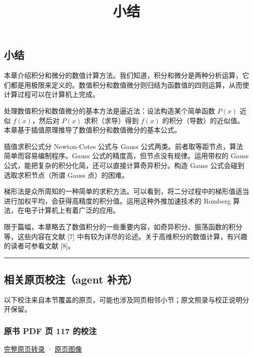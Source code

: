 \documentclass[
  10pt,
  fontset=fandol]{ctexart}
\title{小结}
\author{}
\date{}
\begin{document}
\maketitle

\subsection{小结}\label{ux5c0fux7ed3}

本章介绍积分和微分的数值计算方法。我们知道，积分和微分是两种分析运算，它们都是用极限来定义的。数值积分和数值微分则归结为函数值的四则运算，从而使计算过程可以在计算机上完成。

处理数值积分和数值微分的基本方法是逼近法：设法构造某个简单函数 \(P(x)\) 近似 \(f(x)\)，然后对 \(P(x)\) 求积（求导）得到 \(f(x)\) 的积分（导数）的近似值。本章基于插值原理推导了数值积分和数值微分的基本公式。

插值求积公式分 Newton-Cotes 公式与 Gauss 公式两类。前者取等距节点，算法简单而容易编制程序。Gauss 公式的精度高，但节点没有规律。运用带权的 Gauss 公式，能把复杂的积分化简，还可以直接计算奇异积分。构造 Gauss 公式会碰到选取求积节点（所谓 Gauss 点）的困难。

梯形法是众所周知的一种简单的求积方法。可以看到，将二分过程中的梯形值适当进行加权平均，会获得高精度的积分值。运用这种外推加速技术的 Romberg 算法，在电子计算机上有着广泛的应用。

限于篇幅，本章略去了数值积分的一些重要内容，如奇异积分、振荡函数的积分等，这些内容在文献 {[}7{]} 中有较为详尽的论述。关于高维积分的数值计算，有兴趣的读者可参看文献 {[}8{]}。

\begin{center}\rule{0.5\linewidth}{0.5pt}\end{center}

\subsection{相关原页校注（agent 补充）}\label{ux76f8ux5173ux539fux9875ux6821ux6ce8agent-ux8865ux5145}

以下校注来自本节覆盖的原页，可能也涉及同页相邻小节；原文照录与校正说明分开保留。

\subsubsection{原书 PDF 页 117 的校注}\label{ux539fux4e66-pdf-ux9875-117-ux7684ux6821ux6ce8}

\href{../pages/pdf-117.md}{完整原页转录} · \href{../../source-images/pdf-117.jpeg}{原页图像}
\end{document}
